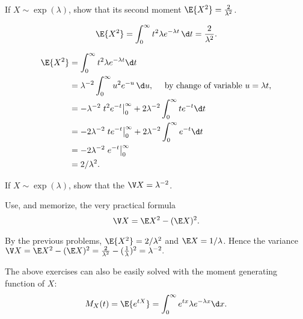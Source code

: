 \begin{exercise}\label{ex:15} 
  If $X\sim\exp(\lambda)$, show that its second moment $\E{X^2} =  \frac{2}{\lambda^2}$.
  \begin{hint}
  \begin{equation*}
  \E{X^2}= \int_0^\infty t^2 \lambda e^{-\lambda t}\, \d t =  \frac{2}{\lambda^2}.
  \end{equation*}
  \end{hint}
  \begin{solution}
    \begin{align*}
\E{X^2} 
&= \int_0^\infty t^2 \lambda e^{-\lambda t} \d t \\
&=   \lambda^{-2} \int_0^\infty u^2 e^{-u}\, \d u, \quad \text{ by  change of variable $u=\lambda t$},   \\
&= -\lambda^{-2}\left. t^2 e^{- t}\right|_0^\infty + 2\lambda^{-2}\int_0^\infty t e^{- t} \d t \\
&=  -2\lambda^{-2}\left. t e^{- t}\right|_0^\infty + 2\lambda^{-2} \int_0^\infty e^{- t} \d t\\
&=  - 2\lambda^{-2} \left. e^{- t} \right|_0^\infty \\
&=  2/\lambda^2.
    \end{align*}
  \end{solution}
\end{exercise}


\begin{exercise} 
  If $X\sim\exp(\lambda)$, show that the 
$\V X = \lambda^{-2}$.
  \begin{hint} Use, and memorize, the very practical formula
  \begin{equation*}
  \V X = \E X^2 - (\E X)^2.
  \end{equation*}
  \end{hint}
  \begin{solution}
    By the previous problems, $\E{X^2}=2/\lambda^2$ and $\E X = 1/\lambda$. Hence the variance $\V X = \E X^2 - (\E X)^2 = \frac{2}{\lambda^2} - (\frac{1}{\lambda})^2 = \lambda^{-2}.$
  \end{solution}
\end{exercise}

The  above exercises can also be easily solved with the moment generating function of $X$:
\begin{equation}\label{eq:60}
  M_X(t) = \E{e^{t X}} = \int_0^\infty e^{t x} \lambda e^{-\lambda x} \d x.
\end{equation}

